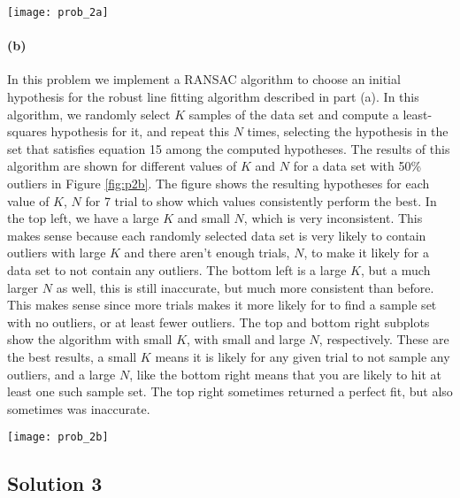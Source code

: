 \documentclass{article}
\newcommand{\solution}[1]{\clearpage \subsection*{Solution #1}}
\newcommand{\spart}[1]{\paragraph{(#1)}}
\begin{document}
\begin{figure*}[!h]
	\centering
	\texttt{[image: prob\_2a]}
	\caption{Robust Line Fitting}
	\label{fig:p2a}
\end{figure*}


\spart{b} In this problem we implement a RANSAC algorithm to choose an initial hypothesis for the robust line fitting algorithm described in part (a). In this algorithm, we randomly select $K$ samples of the data set and compute a least-squares hypothesis for it, and repeat this $N$ times, selecting the hypothesis in the set that satisfies equation 15 among the computed hypotheses. The results of this algorithm are shown for different values of $K$ and $N$ for a data set with 50\% outliers in Figure \ref{fig:p2b}. The figure shows the resulting hypotheses for each value of $K$, $N$ for 7 trial to show which values consistently perform the best. In the top left, we have a large $K$ and small $N$, which is very inconsistent. This makes sense because each randomly selected data set is very likely to contain outliers with large $K$ and there aren't enough trials, $N$, to make it likely for a data set to not contain any outliers. The bottom left is a large $K$, but a much larger $N$ as well, this is still inaccurate, but much more consistent than before. This makes sense since more trials makes it more likely for to find a sample set with no outliers, or at least fewer outliers. The top and bottom right subplots show the algorithm with small $K$, with small and large $N$, respectively. These are the best results, a small $K$ means it is likely for any given trial to not sample any outliers, and a large $N$, like the bottom right means that you are likely to hit at least one such sample set. The top right sometimes returned a perfect fit, but also sometimes was inaccurate. 


\begin{figure*}[!h]
	\centering
	\texttt{[image: prob\_2b]}
	\caption{RANSAC Hypothesis Initialization}
	\label{fig:p2b}
\end{figure*}

\solution{3}
\end{document}

